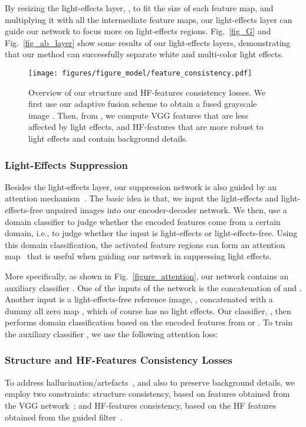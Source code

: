 \documentclass[runningheads]{llncs}
\begin{document}
By resizing the light-effects layer, , to fit the size of each feature map, and multiplying it with all the intermediate feature maps, our light-effects layer can guide our network to focus more on light-effects regions.
Fig.~\ref{fig_G} and Fig.~\ref{fig_ab_layer} show some results of our light-effects layers, demonstrating that our method can successfully separate white and multi-color light effects.

\begin{figure}[t!]
	\captionsetup[subfloat]{farskip=1pt}
	\centering
	{\texttt{[image: figures/figure\_model/feature\_consistency.pdf]}}
	\caption{Overview of our structure and HF-features consistency losses.
		We first use our adaptive fusion scheme to obtain a fused grayscale image . 
Then, from , we compute VGG features  that are less affected by light effects, and HF-features  that are more robust to light effects and contain background details.}
	\label{figure_features}
\end{figure}


\subsubsection{Light-Effects Suppression}
Besides the light-effects layer, our suppression network is also guided by an attention mechanism~\cite{jiang2021enlightengan,kim2019u,jin2021dc}.
The basic idea is that, we input the light-effects and light-effects-free unpaired images into our encoder-decoder network. We then, use a domain classifier to judge whether the encoded features come from a certain domain, i.e., to judge whether the input is light-effects or light-effects-free.
Using this domain classification, the activated feature regions can form an attention map~\cite{zhou2016learning} that is useful when guiding our network in suppressing light effects.

More specifically, as shown in Fig.~\ref{figure_attention}, our network  contains an auxiliary classifier . One of the inputs of the network is the concatenation of  and .    
Another input is a light-effects-free reference image, , concatenated with a dummy all zero map , which of course has no light effects.
Our classifier, , then performs domain classification based on the encoded features from  or .
To train the auxiliary classifier , we use the following attention loss:


\subsubsection{Structure and HF-Features Consistency Losses}
To address hallucination/artefacts~\cite{sharma2020nighttime}, and also to preserve background details, we employ two constraints: structure consistency, based on features obtained from the VGG network~\cite{Johnson16}; and HF-features consistency, based on the HF features obtained from the guided filter~\cite{wu2018fast}.
\end{document}
